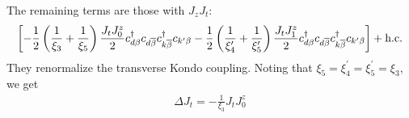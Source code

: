 \documentclass[12pt,twoside]{article}
\numberwithin{equation}{section}
\begin{document}
The remaining terms are those with \(J_z J_t\):
\begin{equation}\begin{aligned}
	\left[-\frac{1}{2}\left(\frac{1}{\xi_3} + \frac{1}{\xi_5}\right)\frac{J_t J^z_0}{2}c^\dagger_{d\beta}c_{d\overline\beta}c^\dagger_{k\overline\beta}c_{k^\prime\beta}-\frac{1}{2}\left(\frac{1}{\xi^\prime_4} + \frac{1}{\xi^\prime_5}\right)\frac{J_t J^z_1}{2}c^\dagger_{d\beta}c_{d\overline\beta}c^\dagger_{k\overline\beta}c_{k^\prime\beta}\right] + \text{h.c.}
\end{aligned}\end{equation}
They renormalize the transverse Kondo coupling. Noting that \(\xi_5 = \xi_4^\prime = \xi_5^\prime = \xi_3\), we get
\begin{equation}\begin{aligned}
	\label{Jt}
	\Delta J_t = -\frac{1}{\xi_3}J_t J^z_0
\end{aligned}\end{equation}
\end{document}
